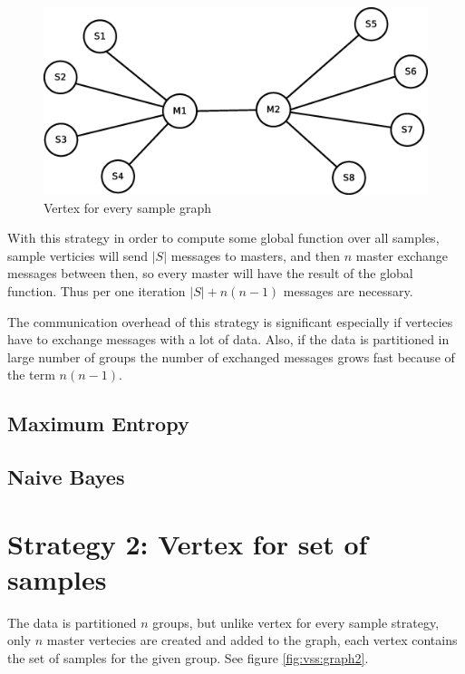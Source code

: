 \documentclass{report}
\begin{document}
\begin{figure}[!htb]
  \centering
  \includegraphics*[scale=0.40]{graph1.eps}
  \caption{Vertex for every sample graph}
  \label{fig:vs:graph1}
\end{figure}

With this strategy in order to compute some global function over all samples, sample verticies will send $|S|$ messages to masters, and then $n$  master exchange messages between then, so every master will have the result of the global function. Thus per one iteration $|S| + n(n-1)$ messages are necessary.

The communication overhead of this strategy is significant especially if vertecies have to exchange messages with a lot of data. Also, if the data is partitioned in large number of groups the number of exchanged messages grows fast because of the term $n(n-1)$.

\subsection{Maximum Entropy}

\subsection{Naive Bayes}

\section{Strategy 2: Vertex for set of samples}

The data is partitioned $n$ groups, but unlike vertex for every sample strategy, only $n$ master vertecies are created and added to the graph, each vertex contains the set of samples for the given group. See figure \ref{fig:vss:graph2}.
\end{document}
